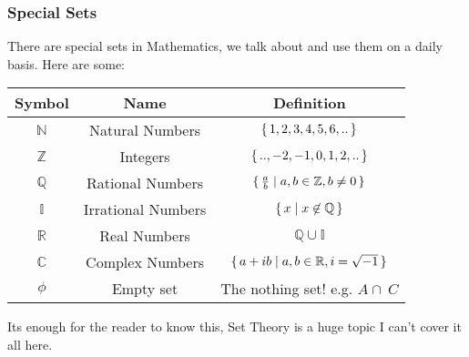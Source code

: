 \subsubsection{Special Sets}
There are special sets in Mathematics, we talk about and use them on a daily basis. Here are some:
\begin{center}
\begin{tabular}{| c | c | c | }
\hline
Symbol & Name & Definition \\
\hline
$\mathbb{N}$      & Natural Numbers & $\set{1,2,3,4,5,6,..}$ \\
$\mathbb{Z}$      & Integers  & $\set{..,-2,-1,0,1,2,..}$        \\
$\mathbb{Q}$      & Rational Numbers & $\set{ \frac{a}{b} \mid a,b \in \mathbb{Z}, b \neq 0}$  \\
$\mathbb{I}$      & Irrational Numbers & $\set{ x \mid x \not\in \mathbb{Q}}$ \\
$\mathbb{R}$      & Real Numbers  &  $\mathbb{Q} \cup \mathbb{I}$  \\
$\mathbb{C}$      & Complex Numbers & $\set{a+ib \mid a,b \in \mathbb{R}, i=\sqrt{-1}}$    \\
$\mathbb{\phi}$   & Empty set   &   The nothing set! e.g. $A \cap \  C$ \\
\hline
\end{tabular}
\end{center}
Its enough for the reader to know this, Set Theory is a huge topic I can't cover it all here.